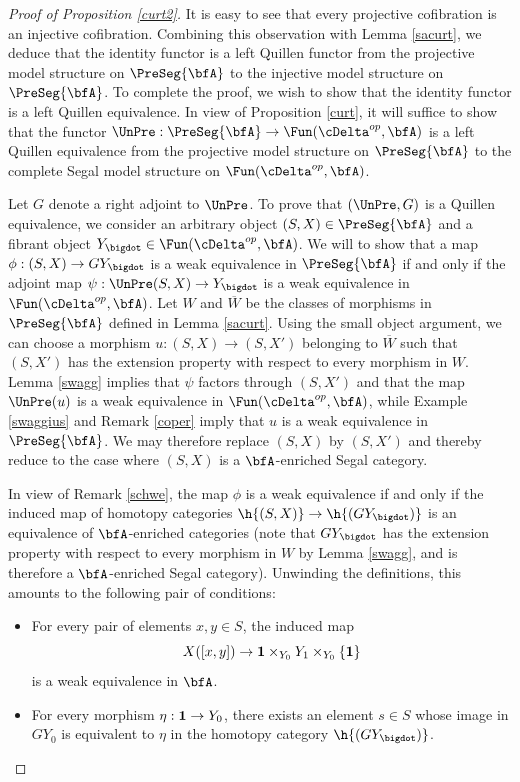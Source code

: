 \begin{proof}[Proof of Proposition \ref{curt2}]
It is easy to see that every projective cofibration is an injective cofibration.
Combining this observation with Lemma \ref{sacurt}, we deduce that the
identity functor is a left Quillen functor from the projective model structure
on $\PreSeg{\bfA}$ to the injective model structure on $\PreSeg{\bfA}$.
To complete the proof, we wish to show that the identity functor is
a left Quillen equivalence. In view of Proposition \ref{curt}, it will suffice
to show that the functor $\UnPre: \PreSeg{\bfA} \rightarrow \Fun( \cDelta^{op}, \bfA)$
is a left Quillen equivalence from the projective model structure on
$\PreSeg{\bfA}$ to the complete Segal model structure on $\Fun( \cDelta^{op}, \bfA)$.

Let $G$ denote a right adjoint to $\UnPre$. To prove that $(\UnPre, G)$ is a Quillen equivalence, we consider an arbitrary object $(S,X) \in \PreSeg{\bfA}$ and a fibrant object $Y_{\bigdot} \in \Fun( \cDelta^{op}, \bfA)$. We will to show that a map $\phi: (S,X) \rightarrow G Y_{\bigdot}$ is a weak equivalence
in $\PreSeg{\bfA}$ if and only if the adjoint map $\psi: \UnPre(S,X) \rightarrow Y_{\bigdot}$ is
a weak equivalence in $\Fun( \cDelta^{op}, \bfA)$. Let $W$ and $\overline{W}$ be the classes of morphisms in $\PreSeg{\bfA}$ defined in Lemma \ref{sacurt}. Using the small object argument, we can choose a morphism $u: (S, X) \rightarrow (S, X')$ belonging to $\overline{W}$ such that
$(S,X')$ has the extension property with respect to every morphism in $W$. Lemma \ref{swagg} implies that $\psi$ factors
through $(S, X')$ and that the map $\UnPre(u)$ is a weak equivalence in $\Fun( \cDelta^{op}, \bfA)$, while Example \ref{swaggius} and Remark \ref{coper} imply that $u$ is a weak equivalence
in $\PreSeg{\bfA}$. We may therefore replace $(S,X)$ by $(S,X')$ and thereby reduce to the case where
$(S,X)$ is a $\bfA$-enriched Segal category. 

In view of Remark \ref{schwe}, the map $\phi$ is a weak equivalence if and only if the
induced map of homotopy categories $\h{(S,X)} \rightarrow \h{(GY_{\bigdot})}$ is an equivalence of $\bfA$-enriched categories (note that $GY_{\bigdot}$ has the extension property with respect
to every morphism in $W$ by Lemma \ref{swagg}, and is therefore a $\bfA$-enriched Segal category). Unwinding the definitions, this amounts to the following pair of conditions:
\begin{itemize}
\item[$(i)$] For every pair of elements $x,y \in S$, the induced map
$$X([x,y]) \rightarrow {\bf 1} \times_{Y_0} Y_1 \times_{Y_0} \{ \bf 1 \}$$
is a weak equivalence in $\bfA$.
\item[$(ii)$] For every morphism $\eta: {\bf 1} \rightarrow Y_0$, there exists
an element $s \in S$ whose image in $GY_0$ is equivalent to $\eta$ in the homotopy
category $\h{(GY_{\bigdot})}$. 
\end{itemize}


\end{proof}
